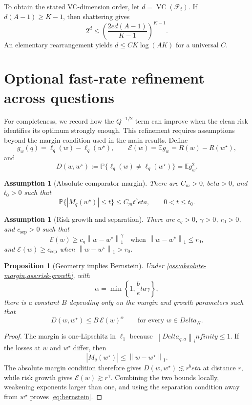 \documentclass[11pt]{article}
\def\beta{beta}%
\def\infty{infinity}%
\def\Delta{Delta}%
\newtheorem{proposition}[theorem]{Proposition}
\newtheorem{assumption}[theorem]{Assumption}
\newcommand{\Pp}{\mathbb P}
\newcommand{\E}{\mathbb E}
\newcommand{\calF}{\mathcal F}
\newcommand{\abs}[1]{\left|#1\right|}
\newcommand{\norm}[1]{\left\lVert#1\right\rVert}
\begin{document}
To obtain the stated VC-dimension order, let $d=\operatorname{VC}(\calF_t)$.  If $d(A-1)\ge K-1$, then shattering gives
\[
2^d
\le
\left(\frac{2ed(A-1)}{K-1}\right)^{K-1}.
\]
An elementary rearrangement yields $d\le C K\log(AK)$ for a universal $C$.

\section{Optional fast-rate refinement across questions}
\label{app:fastQ}

For completeness, we record how the $Q^{-1/2}$ term can improve when the clean risk identifies its optimum strongly enough.  This refinement requires assumptions beyond the margin condition used in the main results.  Define
\[
g_w(q)=\ell_q(w)-\ell_q(w^\star),
\qquad
\mathcal E(w)=\E g_w=R(w)-R(w^\star),
\]
and
\begin{equation}
\label{eq:disagreement}
D(w,w^\star)
:=
\Pp\{\ell_q(w)\ne\ell_q(w^\star)\}
=\E g_w^2.
\end{equation}

\begin{assumption}[Absolute comparator margin]
\label{ass:absolute-margin}
There are $C_m>0$, $\beta>0$, and $t_0>0$ such that
\[
\Pp\{\abs{M_q(w^\star)}\le t\}
\le C_m t^\beta,
\qquad 0<t\le t_0.
\]
\end{assumption}

\begin{assumption}[Risk growth and separation]
\label{ass:risk-growth}
There are $c_g>0$, $\gamma>0$, $r_0>0$, and $c_{\mathrm{sep}}>0$ such that
\[
\mathcal E(w)
\ge
c_g\norm{w-w^\star}_1^\gamma
\quad\text{when }\norm{w-w^\star}_1\le r_0,
\]
and $\mathcal E(w)\ge c_{\mathrm{sep}}$ when $\norm{w-w^\star}_1>r_0$.
\end{assumption}

\begin{proposition}[Geometry implies Bernstein]
\label{prop:geometry-bernstein}
Under \cref{ass:absolute-margin,ass:risk-growth}, with
\[
\alpha=\min\left\{1,\frac\beta\gamma\right\},
\]
there is a constant $B$ depending only on the margin and growth parameters such that
\begin{equation}
\label{eq:bernstein}
D(w,w^\star)
\le
B\,\mathcal E(w)^\alpha
\qquad\text{for every }w\in\Delta_K.
\end{equation}
\end{proposition}

\begin{proof}
The margin is one-Lipschitz in $\ell_1$ because $\norm{\Delta_{q,a}}_\infty\le1$.  If the losses at $w$ and $w^\star$ differ, then
\[
\abs{M_q(w^\star)}
\le
\norm{w-w^\star}_1.
\]
The absolute margin condition therefore gives $D(w,w^\star)\lesssim r^\beta$ at distance $r$, while risk growth gives $\mathcal E(w)\gtrsim r^\gamma$.  Combining the two bounds locally, weakening exponents larger than one, and using the separation condition away from $w^\star$ proves \eqref{eq:bernstein}.
\end{proof}
\end{document}

